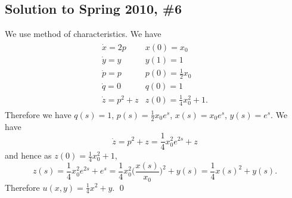 \subsection*{Solution to Spring 2010, \#6}\label{s106}
We use method of characteristics. We have
\begin{align*}
\begin{array}{ll}
 \dot{x} = 2p & x(0) = x_{0}\\
 \dot{y} = y & y(1) = 1\\
 \dot{p} = p & p(0) = \frac{1}{2}x_{0}\\
 \dot{q} = 0 & q(0) = 1\\
 \dot{z} = p^{2} + z & z(0) = \frac{1}{4}x_{0}^{2} + 1.
\end{array}
\end{align*}
Therefore we have $q(s) = 1$, $p(s) = \frac{1}{2}x_{0}e^{s}$, $x(s) = x_{0}e^{s}$, $y(s) = e^{s}$.
We have
$$\dot{z} = p^{2} + z = \frac{1}{4}x_{0}^{2}e^{2s} + z$$
and hence as $z(0) = \frac{1}{4}x_{0}^{2} + 1$,
$$z(s) = \frac{1}{4}x_{0}^{2} e^{2s} + e^{s} = \frac{1}{4}x_{0}^{2}\bigg(\frac{x(s)}{x_{0}}\bigg)^{2} + y(s) = \frac{1}{4}x(s)^{2} + y(s).$$
Therefore $u(x, y) = \frac{1}{4}x^{2} + y.$
\hfill\qed

